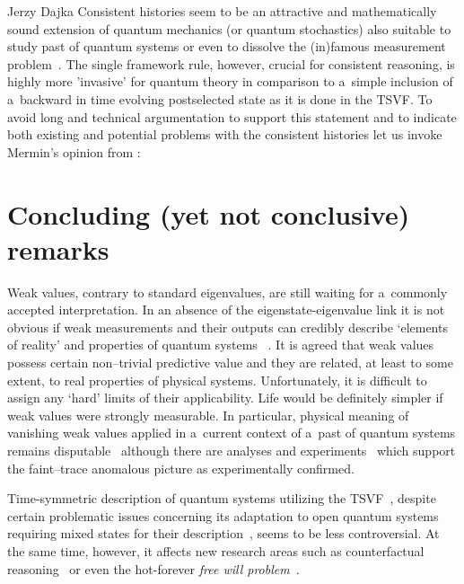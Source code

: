\begin{artengenv}{Jerzy Dajka}
%
Consistent histories seem to be an attractive and mathematically sound extension of quantum mechanics (or quantum stochastics) also suitable to study past of quantum systems  or even  to dissolve the  (in)famous measurement problem~\parencite{GRIFFITHS_measur,Griffiths_reason}. The single framework rule, however, crucial for consistent reasoning, is highly more 'invasive' for quantum theory in comparison to a~simple inclusion of a~backward in time evolving postselected state as it is done in the TSVF. To avoid long and technical argumentation  to support this statement and to indicate both existing and potential problems with the consistent histories let us invoke Mermin's opinion from   
\parencite*{mermin}:

\section{Concluding (yet not conclusive) remarks}

Weak values, contrary to standard eigenvalues, are still waiting for a~commonly accepted interpretation. In an absence of the eigenstate-eigenvalue link it is not obvious if weak measurements and their outputs can credibly describe `elements of reality' and properties of quantum systems ~\parencite{Matzkin_prop,vaid_trans}. It is agreed that weak values possess certain non--trivial predictive value and they are related, at least to some extent, to real properties of physical systems. Unfortunately, it is difficult to assign any `hard' limits of their applicability. Life would be definitely simpler if weak values were strongly measurable. In particular,  
  physical meaning of vanishing weak values applied in  a~current context of a~past of quantum systems  remains disputable~\parencite{PhysRevA.95.032110,PhysRevA.97.046102,PhysRevA.97.046103,weak,lady} although  there are analyses and experiments~\parencite{e20110854,PhysRevA.101.052119,pnas,pnas1} which support the faint--trace anomalous picture as experimentally confirmed.   

Time-symmetric description of quantum systems utilizing the TSVF~\parencite{aharonov_entrop,Aharonov2008}, despite certain problematic issues concerning its adaptation to open quantum systems requiring mixed states for their description~\parencite{weak,scirep},   seems to be less controversial. At the same time, however, it affects new research areas such as counterfactual reasoning~\parencite{kont0}  or even the hot-forever {\it free will problem}~\parencite{wil}. 


\end{artengenv}
